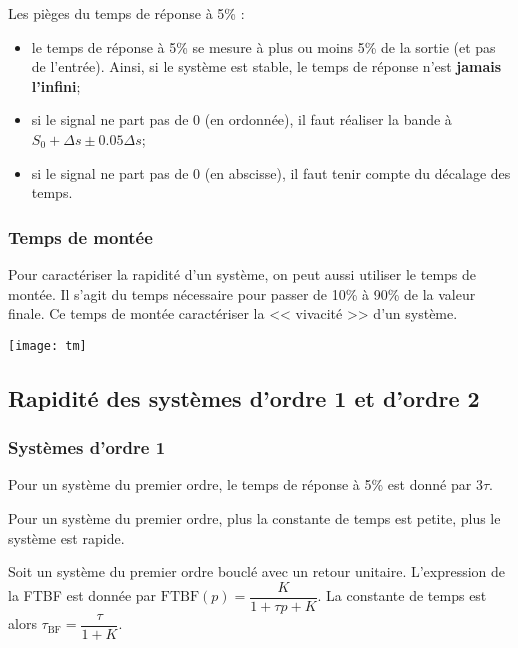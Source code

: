 \begin{exemple}
Les pièges du temps de réponse à 5\% :
\begin{itemize}
\item le temps de réponse à 5\% se mesure à plus ou moins 5\% de la sortie (et pas de l'entrée). Ainsi, si le système est stable, le temps de réponse n'est \textbf{jamais l'infini};
\item si le signal ne part pas de 0 (en ordonnée), il faut réaliser la bande à $S_0+\Delta s \pm 0.05\Delta s$;
\item si le signal ne part pas de 0 (en abscisse), il faut tenir compte du décalage des temps.
\end{itemize}

\end{exemple}

\subsubsection{Temps de montée}



Pour caractériser la rapidité d'un système, on peut aussi utiliser le temps de montée. Il s'agit du temps nécessaire pour passer de 10\% à 90\% de la valeur finale. Ce temps de montée caractériser la << vivacité >> d'un système. 
\begin{marginfigure}
\centering
\texttt{[image: tm]}
\end{marginfigure}


\subsection{Rapidité des systèmes d'ordre 1 et d'ordre 2}
\subsubsection{Systèmes d'ordre 1}
Pour un système du premier ordre, le temps de réponse à 5\% est donné par $3\tau$.
\begin{resultat}
Pour un système du premier ordre, plus la constante de temps est petite, plus le système est rapide.
\end{resultat}

Soit un système du premier ordre bouclé avec un retour unitaire. L'expression de la FTBF est donnée par $\text{FTBF}(p)=\dfrac{K}{1+\tau p + K}$. La constante de temps est alors $\tau_{\text{BF}}=\dfrac{\tau}{1+K}$. 

